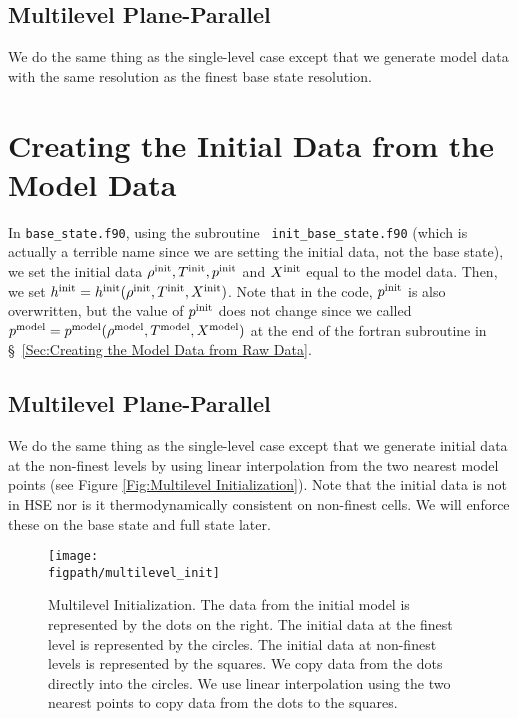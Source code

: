 \subsection{Multilevel Plane-Parallel}
We do the same thing as the single-level case except that we generate
model data with the same resolution as the finest base state
resolution.


\section{Creating the Initial Data from the Model Data}
In {\tt base\_state.f90}, using the subroutine {\tt
  init\_base\_state.f90} (which is actually a terrible name since we
are setting the initial data, not the base state), we set the initial
data $\rho^{\rm init}, T^{\rm init}, p^{\rm init}$ and $X^{\rm init}$ equal to the
model data.  Then, we set $h^{\rm init} =
h^{\rm init}(\rho^{\rm init},T^{\rm init},X^{\rm init})$.  Note that in the code,
$p^{\rm init}$ is also overwritten, but the value of $p^{\rm init}$ does not
change since we called $p^{\rm model} =
p^{\rm model}(\rho^{\rm model},T^{\rm model},X^{\rm model})$ at the end of the
fortran subroutine in \S~\ref{Sec:Creating the Model Data from Raw
  Data}.

\subsection{Multilevel Plane-Parallel}
We do the same thing as the single-level case except that we generate
initial data at the non-finest levels by using linear interpolation
from the two nearest model points (see Figure \ref{Fig:Multilevel
  Initialization}).  Note that the initial data is not in HSE nor is
it thermodynamically consistent on non-finest cells.  We will enforce
these on the base state and full state later.
\begin{figure}[tpb]
\centering
\texttt{[image: \\figpath/multilevel\_init]}\hspace{0.2in}
\begin{minipage}[b]{5.0in}
\caption{Multilevel Initialization.  The data from the initial model
  is represented by the dots on the right.  The initial data at the
  finest level is represented by the circles.  The initial data at
  non-finest levels is represented by the squares.  We copy data from
  the dots directly into the circles.  We use linear interpolation
  using the two nearest points to copy data from the dots to the
  squares.\vspace{2em}}
\end{minipage}
\label{Fig:Multilevel Initialization}
\end{figure}


